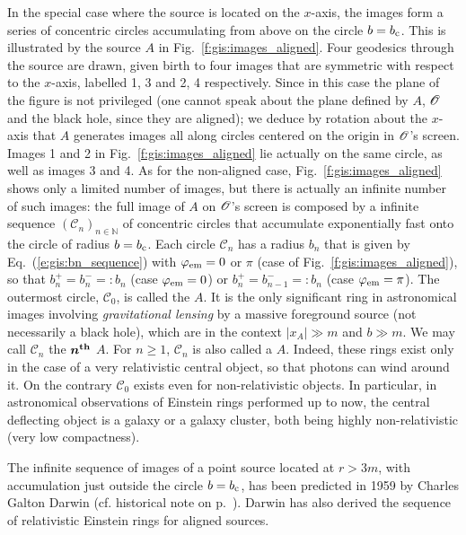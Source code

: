 In the special case where the source is located on the $x$-axis, the images form
a series of concentric circles accumulating from above on the circle
$b = b_{\rm c}$. This is illustrated by the source $A$ in
Fig.~\ref{f:gis:images_aligned}. Four geodesics through the source are drawn,
given birth to four images that
are symmetric with respect to the $x$-axis, labelled 1, 3 and 2, 4 respectively.
Since in this case the plane of the figure is not privileged (one cannot speak
about the plane defined by $A$, $\mathscr{O}$ and the black hole, since they are aligned);
we deduce by rotation about the $x$-axis that $A$ generates images all along
circles centered on the origin in $\mathscr{O}$'s screen. Images 1 and 2 in Fig.~\ref{f:gis:images_aligned}
lie actually on the same circle, as well as images 3 and 4.
As for the non-aligned case, Fig.~\ref{f:gis:images_aligned} shows only a limited number of
images, but there is actually an infinite number of such images: the full image
of $A$ on $\mathscr{O}$'s screen is composed by a infinite sequence $(\mathscr{C}_n)_{n\in\mathbb{N}}$
of concentric circles
that accumulate exponentially fast onto the circle of radius $b = b_{\rm c}$.
Each circle $\mathscr{C}_n$ has a radius $b_n$ that is given
by Eq.~(\ref{e:gis:bn_sequence}) with $\varphi_{\rm em} = 0$ or $\pi$ (case of
Fig.~\ref{f:gis:images_aligned}), so that $b_n^+ = b_n^- =: b_n$ (case $\varphi_{\rm em} = 0$)
or $b_n^+ = b_{n-1}^- =: b_n$ (case $\varphi_{\rm em} = \pi$).
The outermost circle, $\mathscr{C}_0$, is called the
 $A$.
It is the only significant ring in astronomical images involving \emph{gravitational
lensing} by a massive foreground source (not necessarily
a black hole), which are in the context $|x_A|\gg m$ and $b\gg m$.
We may call $\mathscr{C}_n$ the $\bm{n^{\rm th}}$ $A$.
For $n\geq 1$, $\mathscr{C}_n$ is also called a 
$A$. Indeed, these rings exist only in the case of a very relativistic central object, so that
photons can wind around it. On the contrary $\mathscr{C}_0$ exists even for non-relativistic
objects. In particular, in astronomical observations of Einstein rings performed up
to now, the central deflecting object is a galaxy or a galaxy cluster,
both being highly non-relativistic (very low compactness).

\begin{hist} \label{h:gis:seq_images_Darwin}
The infinite sequence of images of a point source located at $r>3m$, with accumulation just outside the circle $b=b_{\rm c}$, has been predicted in 1959 by
Charles Galton Darwin \cite{Darwi59}
(cf. historical note on p.~\pageref{h:gis:Darwin_formula}). Darwin has
also derived the sequence of relativistic Einstein rings for aligned sources.
\end{hist}


